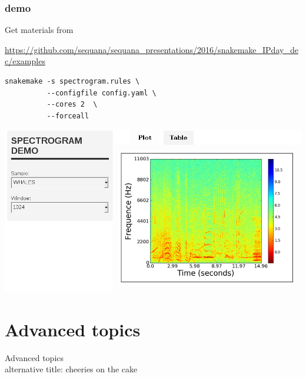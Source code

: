 \documentclass{beamer}
\begin{document}

\begin{frame}[fragile]
\frametitle{demo}
Get materials from  

\url{https://github.com/sequana/sequana_presentations/2016/snakemake_IPday_dec/examples}
\begin{block}{}
    \begin{lstlisting}[basicstyle=\large]
snakemake -s spectrogram.rules \
          --configfile config.yaml \
          --cores 2  \
          --forceall
\end{lstlisting}
\end{block}
\end{frame}


\begin{frame}
\begin{block}{}
 \includegraphics[scale=0.32]{images/results.png}
\end{block}
\end{frame}




\section{Advanced topics}
\begin{frame}[plain]
 \centering
 \begin{Huge}
Advanced topics 
\\
\large{alternative title: cheeries on the cake}
\end{Huge}
\end{frame}

\end{document}
